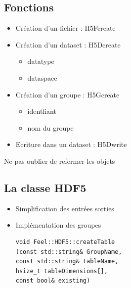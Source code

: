 \documentclass{beamer}
\begin{document}
\subsection{Fonctions}
\begin{frame}
\begin{itemize}
    \item Création d'un fichier : H5Fcreate
    \item Création d'un dataset : H5Dcreate
        \begin{itemize}
            \item datatype
            \item dataspace
        \end{itemize}
    \item Création d'un groupe  : H5Gcreate
        \begin{itemize}
            \item identfiant
            \item nom du groupe
        \end{itemize}
    \item Ecriture dans un dataset : H5Dwrite
\end{itemize}
Ne pas oublier de refermer les objets
\end{frame}
\subsection{La classe HDF5}
\begin{frame}[fragile]
\begin{itemize}
\item Simplification des entrées sorties
\item Implémentation des groupes
\begin{lstlisting}
void Feel::HDF5::createTable 
(const std::string& GroupName, 
const std::string& tableName, 
hsize_t tableDimensions[], 
const bool& existing)
\end{lstlisting}
\end{itemize}
\end{frame}
\end{document}
